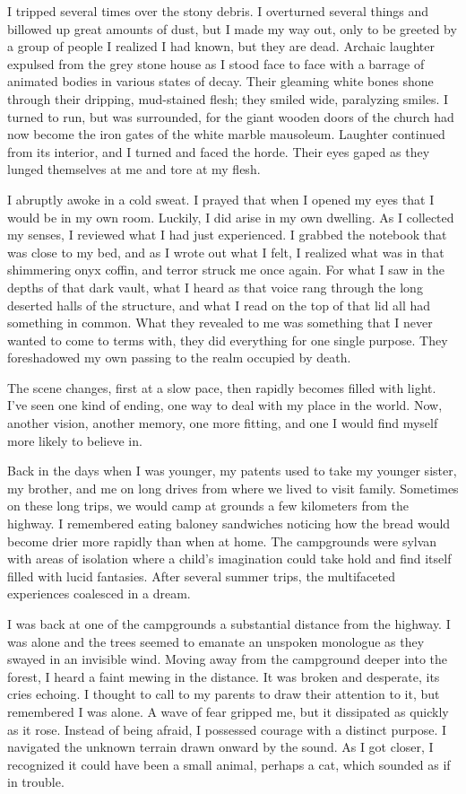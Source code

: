 \documentclass[
]{article}
\begin{document}
I tripped several times over the stony debris. I overturned several
things and billowed up great amounts of dust, but I made my way out,
only to be greeted by a group of people I realized I had known, but they
are dead. Archaic laughter expulsed from the grey stone house as I stood
face to face with a barrage of animated bodies in various states of
decay. Their gleaming white bones shone through their dripping,
mud-stained flesh; they smiled wide, paralyzing smiles. I turned to run,
but was surrounded, for the giant wooden doors of the church had now
become the iron gates of the white marble mausoleum. Laughter continued
from its interior, and I turned and faced the horde. Their eyes gaped as
they lunged themselves at me and tore at my flesh.

I abruptly awoke in a cold sweat. I prayed that when I opened my eyes
that I would be in my own room. Luckily, I did arise in my own dwelling.
As I collected my senses, I reviewed what I had just experienced. I
grabbed the notebook that was close to my bed, and as I wrote out what I
felt, I realized what was in that shimmering onyx coffin, and terror
struck me once again. For what I saw in the depths of that dark vault,
what I heard as that voice rang through the long deserted halls of the
structure, and what I read on the top of that lid all had something in
common. What they revealed to me was something that I never wanted to
come to terms with, they did everything for one single purpose. They
foreshadowed my own passing to the realm occupied by death.

The scene changes, first at a slow pace, then rapidly becomes filled
with light. I've seen one kind of ending, one way to deal with my place
in the world. Now, another vision, another memory, one more fitting, and
one I would find myself more likely to believe in.

Back in the days when I was younger, my patents used to take my younger
sister, my brother, and me on long drives from where we lived to visit
family. Sometimes on these long trips, we would camp at grounds a few
kilometers from the highway. I remembered eating baloney sandwiches
noticing how the bread would become drier more rapidly than when at
home. The campgrounds were sylvan with areas of isolation where a
child's imagination could take hold and find itself filled with lucid
fantasies. After several summer trips, the multifaceted experiences
coalesced in a dream.

I was back at one of the campgrounds a substantial distance from the
highway. I was alone and the trees seemed to emanate an unspoken
monologue as they swayed in an invisible wind. Moving away from the
campground deeper into the forest, I heard a faint mewing in the
distance. It was broken and desperate, its cries echoing. I thought to
call to my parents to draw their attention to it, but remembered I was
alone. A wave of fear gripped me, but it dissipated as quickly as it
rose. Instead of being afraid, I possessed courage with a distinct
purpose. I navigated the unknown terrain drawn onward by the sound. As I
got closer, I recognized it could have been a small animal, perhaps a
cat, which sounded as if in trouble.
\end{document}
